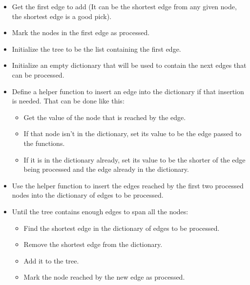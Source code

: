 {\begin{itemize}
\item Get the first edge to add (It can be the shortest edge from any given node, the shortest edge is a good pick).

\item Mark the nodes in the first edge as processed.

\item Initialize the tree to be the list containing the first edge.

\item Initialize an empty dictionary that will be used to contain the next edges that can be processed.

\item Define a helper function to insert an edge into the dictionary  if that insertion is needed.
	That can be done like this:

	\begin{itemize}

	\item Get the value of the node that is reached by the edge.

	\item If that node isn't in the dictionary, set its value to be the edge passed to the functions.

	\item If it is in the dictionary already, set its value to be the shorter of the edge being processed and the edge already in the dictionary.

	\end{itemize}

\item Use the helper function to insert the edges reached by the first two processed nodes into the dictionary of edges to be processed.

\item Until the tree contains enough edges to span all the nodes:

	\begin{itemize}

	\item Find the shortest edge in the dictionary of edges to be processed.

	\item Remove the shortest edge from the dictionary.

	\item Add it to the tree.

	\item Mark the node reached by the new edge as processed.


\end{itemize}
\end{itemize}}
